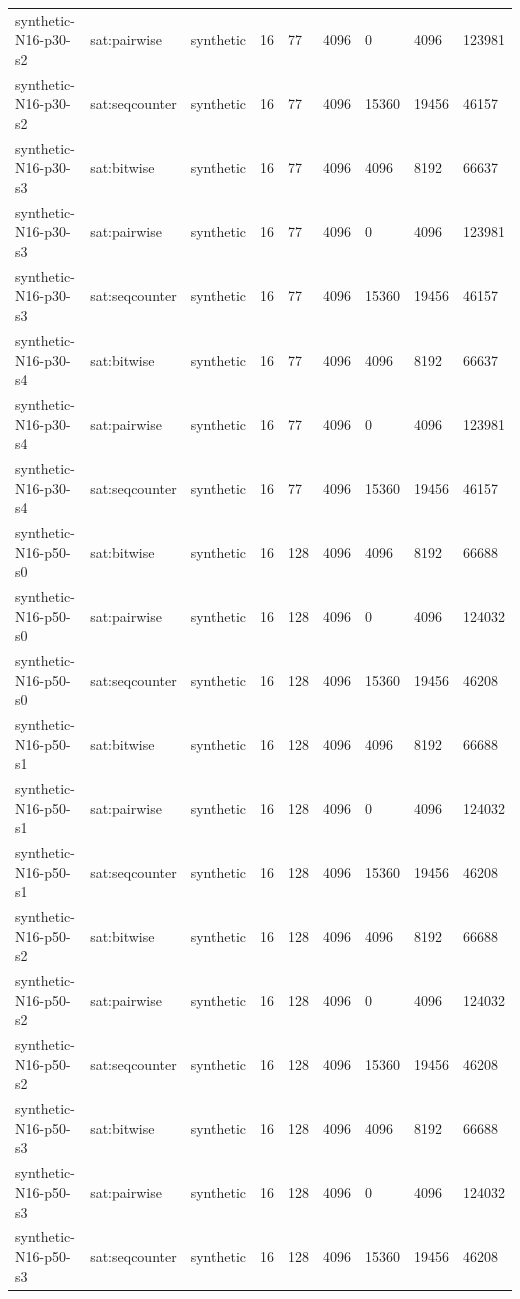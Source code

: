 \begin{tabular}{lllllllll}
synthetic-N16-p30-s2 & sat:pairwise & synthetic & 16 & 77 & 4096 & 0 & 4096 & 123981 \\
synthetic-N16-p30-s2 & sat:seqcounter & synthetic & 16 & 77 & 4096 & 15360 & 19456 & 46157 \\
synthetic-N16-p30-s3 & sat:bitwise & synthetic & 16 & 77 & 4096 & 4096 & 8192 & 66637 \\
synthetic-N16-p30-s3 & sat:pairwise & synthetic & 16 & 77 & 4096 & 0 & 4096 & 123981 \\
synthetic-N16-p30-s3 & sat:seqcounter & synthetic & 16 & 77 & 4096 & 15360 & 19456 & 46157 \\
synthetic-N16-p30-s4 & sat:bitwise & synthetic & 16 & 77 & 4096 & 4096 & 8192 & 66637 \\
synthetic-N16-p30-s4 & sat:pairwise & synthetic & 16 & 77 & 4096 & 0 & 4096 & 123981 \\
synthetic-N16-p30-s4 & sat:seqcounter & synthetic & 16 & 77 & 4096 & 15360 & 19456 & 46157 \\
synthetic-N16-p50-s0 & sat:bitwise & synthetic & 16 & 128 & 4096 & 4096 & 8192 & 66688 \\
synthetic-N16-p50-s0 & sat:pairwise & synthetic & 16 & 128 & 4096 & 0 & 4096 & 124032 \\
synthetic-N16-p50-s0 & sat:seqcounter & synthetic & 16 & 128 & 4096 & 15360 & 19456 & 46208 \\
synthetic-N16-p50-s1 & sat:bitwise & synthetic & 16 & 128 & 4096 & 4096 & 8192 & 66688 \\
synthetic-N16-p50-s1 & sat:pairwise & synthetic & 16 & 128 & 4096 & 0 & 4096 & 124032 \\
synthetic-N16-p50-s1 & sat:seqcounter & synthetic & 16 & 128 & 4096 & 15360 & 19456 & 46208 \\
synthetic-N16-p50-s2 & sat:bitwise & synthetic & 16 & 128 & 4096 & 4096 & 8192 & 66688 \\
synthetic-N16-p50-s2 & sat:pairwise & synthetic & 16 & 128 & 4096 & 0 & 4096 & 124032 \\
synthetic-N16-p50-s2 & sat:seqcounter & synthetic & 16 & 128 & 4096 & 15360 & 19456 & 46208 \\
synthetic-N16-p50-s3 & sat:bitwise & synthetic & 16 & 128 & 4096 & 4096 & 8192 & 66688 \\
synthetic-N16-p50-s3 & sat:pairwise & synthetic & 16 & 128 & 4096 & 0 & 4096 & 124032 \\
synthetic-N16-p50-s3 & sat:seqcounter & synthetic & 16 & 128 & 4096 & 15360 & 19456 & 46208 \\

\end{tabular}
